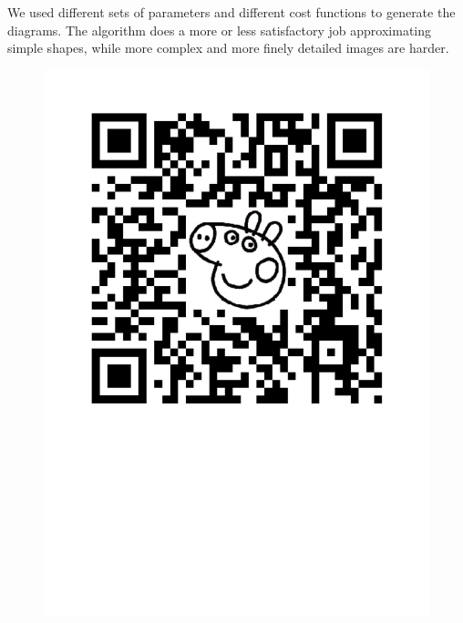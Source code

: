 \documentclass[a1,portrait]{a0poster}
\begin{document}
\begin{multicols}{2}
\begin{center}
\begin{minipage}{.5\linewidth}
		\label{fig:colored1}
	\end{minipage}
\end{center}

We used different sets of parameters and different cost functions to generate the diagrams.
The algorithm does a more or less satisfactory job approximating simple shapes, while
more complex and more finely detailed images are harder.





\begin{figure}
	\includegraphics[width=.95\linewidth, right]{qr-code.pdf}
	\label{fig:qr}
\end{figure}


\end{multicols}
\end{document}
